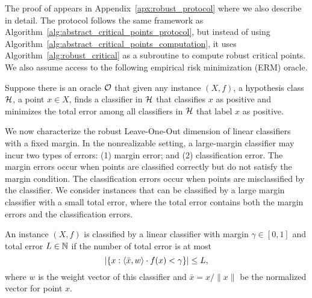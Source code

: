 
The proof of  appears in Appendix~\ref{apx:robust_protocol} where we also describe  in detail. 
The protocol follows the same framework as Algorithm~\ref{alg:abstract_critical_points_protocol}, but instead of using Algorithm~\ref{alg:abstract_critical_points_computation}, it uses Algorithm~\ref{alg:robust_critical} as a subroutine to compute robust critical points.
We also assume access to the following empirical risk minimization (ERM) oracle.

\begin{assumption}\label{asp:oracle}
    Suppose there is an oracle $\mathcal{O}$ that given any instance $(X,f)$, a hypothesis class $\mathcal{H}$, a point $x \in X$, finds a classifier in $\mathcal{H}$ that classifies $x$ as positive and minimizes the total error among all classifiers in $\mathcal{H}$ that label $x$ as positive.
\end{assumption}

%



We now characterize the robust Leave-One-Out dimension of linear classifiers with a fixed margin. 
In the nonrealizable setting, a large-margin classifier may incur two types of errors: (1) margin error; and (2) classification error. The margin errors occur when points are classified correctly but do not satisfy the margin condition. 
The classification errors occur when points are misclassified by the classifier. 
We consider instances that can be classified by a large margin classifier with a small total error, where the total error contains both the margin errors and the classification errors. 

\begin{definition}
    An instance $(X,f)$ is classified by a linear classifier with margin $\gamma \in [0,1]$ and total error $L \in \mathbb{N}$ if the number of total error is at most
    $$
    |\{x: \langle \bar{x}, w\rangle \cdot f(x) < \gamma\}|  \leq L,
    $$
    where $w$ is the weight vector of this classifier and $\bar{x} = x / \|x\|$ be the normalized vector for point $x$.
\end{definition}

